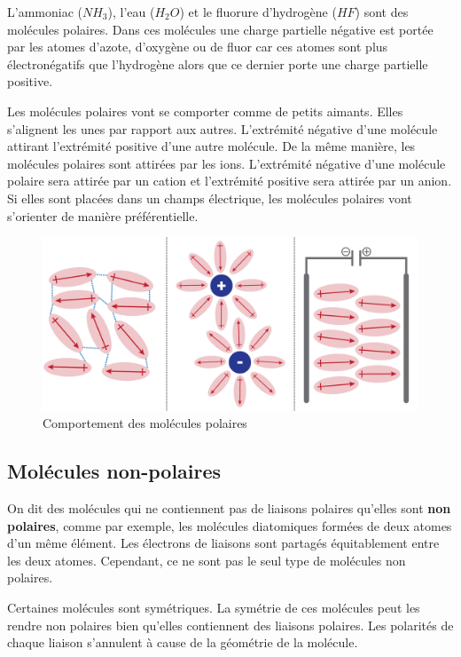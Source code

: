 \documentclass[
  11pt,
  french,
  a4paper,
  openany]{book}
\begin{document}
L'ammoniac (\(NH_3\)), l'eau (\(H_2O\)) et le fluorure d'hydrogène (\(HF\)) sont des molécules polaires. Dans ces molécules une charge partielle négative est portée par les atomes d'azote, d'oxygène ou de fluor car ces atomes sont plus électronégatifs que l'hydrogène alors que ce dernier porte une charge partielle positive.

Les molécules polaires vont se comporter comme de petits aimants. Elles s'alignent les unes par rapport aux autres. L'extrémité négative d'une molécule attirant l'extrémité positive d'une autre molécule. De la même manière, les molécules polaires sont attirées par les ions. L'extrémité négative d'une molécule polaire sera attirée par un cation et l'extrémité positive sera attirée par un anion. Si elles sont placées dans un champs électrique, les molécules polaires vont s'orienter de manière préférentielle.

\begin{figure}

{\centering \includegraphics[width=0.6\linewidth]{images/dipole-3} 

}

\caption{Comportement des molécules polaires}\label{fig:dipole-3}
\end{figure}

\hypertarget{moluxe9cules-non-polaires}{%
\subsection{Molécules non-polaires}\label{moluxe9cules-non-polaires}}

On dit des molécules qui ne contiennent pas de liaisons polaires qu'elles sont \textbf{non polaires}, comme par exemple, les molécules diatomiques formées de deux atomes d'un même élément. Les électrons de liaisons sont partagés équitablement entre les deux atomes. Cependant, ce ne sont pas le seul type de molécules non polaires.

Certaines molécules sont symétriques. La symétrie de ces molécules peut les rendre non polaires bien qu'elles contiennent des liaisons polaires. Les polarités de chaque liaison s'annulent à cause de la géométrie de la molécule.
\end{document}
